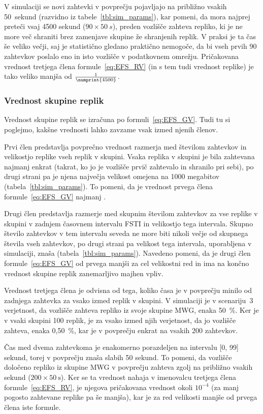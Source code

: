 \documentclass[a4paper, 12pt]{book}
\begin{document}
V simulaciji se novi zahtevki v povprečju pojavljajo na približno vsakih
50~sekund (razvidno iz tabele~\ref{tbl:sim_params}), kar pomeni, da mora
najprej preteči vsaj 4500 sekund ($90 \times 50\:s$), preden vozlišče
zahteva repliko, ki je ne more več shraniti brez zamenjave skupine
že shranjenih replik. V praksi je ta čas še veliko večji, saj je statistično
gledano praktično nemogoče, da bi vseh prvih 90 zahtevkov poslalo eno in isto
vozlišče v podatkovnem omrežju. Pričakovana vrednost tretjega člena
formule~\eqref{eq:EFS_RV} (in s tem tudi vrednost replike) je tako veliko
manjša od $\frac{1}{\numprint{4500}}$.

\subsubsection{Vrednost skupine replik}

Vrednost skupine replik se izračuna po formuli~\eqref{eq:EFS_GV}. Tudi tu si
poglejmo, kakšne vrednosti lahko zavzame vsak izmed njenih členov.

Prvi člen predstavlja povprečno vrednost razmerja med številom zahtevkov in
velikostjo replike vseh replik v skupini. Vsaka replika v skupini je bila
zahtevana najmanj enkrat (takrat, ko jo je vozlišče prvič zahtevalo in shranilo
pri sebi), po drugi strani pa je njena največja velikost omejena na
1000 megabitov (tabela~\ref{tbl:sim_params}). To pomeni, da je vrednost
prvega člena formule~\eqref{eq:EFS_GV} najmanj .

Drugi člen predstavlja razmerje med skupnim številom zahtevkov za vse replike
v skupini v zadnjem časovnem intervalu FSTI in velikostjo tega intervala.
Skupno število zahtevkov v tem intervalu seveda ne more biti nikoli večje od
skupnega števila vseh zahtevkov, po drugi strani pa velikost tega intervala,
uporabljena v simulaciji, znaša  (tabela~\ref{tbl:sim_params}).
Navedeno pomeni, da je drugi člen formule~\eqref{eq:EFS_GV} od prvega manjši za
cel velikostni red in ima na končno vrednost skupine replik zanemarljivo
majhen vpliv.

Vrednost tretjega člena je odvisna od tega, koliko časa je v povprečju minilo
od zadnjega zahtevka za vsako izmed replik v skupini. V simulaciji je v
scenariju~3 verjetnost, da vozlišče zahteva repliko iz svoje
skupine MWG, enaka 50~\%. Ker je v vsaki skupini 100 replik, je za vsako
izmed njih verjetnost, da jo vozlišče zahteva, enaka 0,50~\%, kar je v
povprečju enkrat na vsakih 200 zahtevkov.

Čas med dvema zahtevkoma je enakomerno porazdeljen na intervalu [0, 99] sekund,
torej v povprečju znaša slabih 50 sekund. To pomeni, da vozlišče določeno
repliko iz skupine MWG v povprečju zahteva zgolj na približno vsakih
 sekund ($200 \times 50\:\text{s}$).
Ker se ta vrednost nahaja v imenovalcu tretjega člena
formule~\eqref{eq:EFS_RV}, je njegova pričakovana vrednost okoli $10^{-4}$ (za
manj pogosto zahtevane replike pa še manjša), kar je za red velikosti manjše
od prvega člena iste formule.
\end{document}

